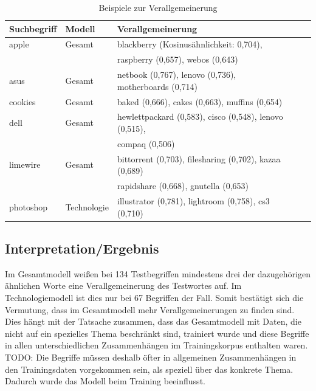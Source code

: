 \documentclass[12pt,a4paper]{report}
\begin{document}
		
		
\begin{table}[H]
\caption{Beispiele zur Verallgemeinerung}
\label{tab:bspVerallgemeinerung}
\begin{center}
\begin{tabular}{|l||l|l|l|l|}
\hline
\textbf{Suchbegriff} & \textbf{Modell} & \textbf{Verallgemeinerung}   \\
\hline
 apple & Gesamt & blackberry (Kosinusähnlichkeit: 0,704),\\
 	&	& raspberry (0,657), webos (0,643)\\
 \hline
 asus	   & Gesamt & netbook (0,767), lenovo (0,736), motherboards (0,714) \\
\hline
 cookies	& Gesamt& baked (0,666), cakes (0,663), muffins (0,654)\\
 	\hline
 dell	 & Gesamt & hewlettpackard (0,583), cisco (0,548), lenovo (0,515),\\
 && compaq (0,506) \\
 \hline
 limewire	& Gesamt& bittorrent (0,703), filesharing (0,702), kazaa (0,689)\\
 &&rapidshare (0,668), gnutella (0,653)\\
 	\hline
 	
 photoshop &	Technologie&	illustrator (0,781), lightroom (0,758), cs3 (0,710) \\
 	\hline
 	
 
\end{tabular}
\end{center}
\end{table}


  
		\subsection*{Interpretation/Ergebnis}
		Im Gesamtmodell weißen bei 134 Testbegriffen mindestens drei der dazugehörigen ähnlichen Worte eine Verallgemeinerung des Testwortes auf. Im Technologiemodell ist dies nur bei 67 Begriffen der Fall. Somit bestätigt sich die Vermutung, dass im Gesamtmodell mehr Verallgemeinerungen zu finden sind. Dies hängt mit der Tatsache zusammen, dass das Gesamtmodell mit Daten, die nicht auf ein spezielles Thema beschränkt sind, trainiert wurde und diese Begriffe in allen unterschiedlichen Zusammenhängen im Trainingskorpus enthalten waren. \\
		
TODO:		Die Begriffe müssen deshalb öfter in allgemeinen Zusammenhängen in den Trainingsdaten vorgekommen sein, als speziell über das konkrete Thema. Dadurch wurde das Modell beim Training beeinflusst.\\
\end{document}
